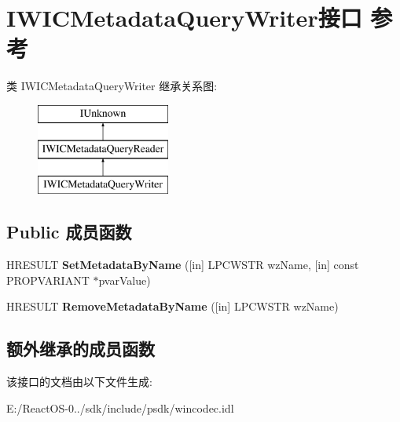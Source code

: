 \hypertarget{interface_i_w_i_c_metadata_query_writer}{}\section{I\+W\+I\+C\+Metadata\+Query\+Writer接口 参考}
\label{interface_i_w_i_c_metadata_query_writer}
类 I\+W\+I\+C\+Metadata\+Query\+Writer 继承关系图\+:\begin{figure}[H]
\begin{center}
\leavevmode
\includegraphics[height=3.000000cm]{interface_i_w_i_c_metadata_query_writer}
\end{center}
\end{figure}
\subsection*{Public 成员函数}
\begin{DoxyCompactItemize}
\item 
\mbox{\label{interface_i_w_i_c_metadata_query_writer_a5aac1af5b0311050107a5f404c0efdf5}} 
H\+R\+E\+S\+U\+LT {\bfseries Set\+Metadata\+By\+Name} (\mbox{[}in\mbox{]} L\+P\+C\+W\+S\+TR wz\+Name, \mbox{[}in\mbox{]} const P\+R\+O\+P\+V\+A\+R\+I\+A\+NT $\ast$pvar\+Value)
\item 
\mbox{\label{interface_i_w_i_c_metadata_query_writer_adfa6c0673ad7b54ba1c20018444e680e}} 
H\+R\+E\+S\+U\+LT {\bfseries Remove\+Metadata\+By\+Name} (\mbox{[}in\mbox{]} L\+P\+C\+W\+S\+TR wz\+Name)
\end{DoxyCompactItemize}
\subsection*{额外继承的成员函数}


该接口的文档由以下文件生成\+:\begin{DoxyCompactItemize}
\item 
E\+:/\+React\+O\+S-\/0../sdk/include/psdk/wincodec.\+idl\end{DoxyCompactItemize}
